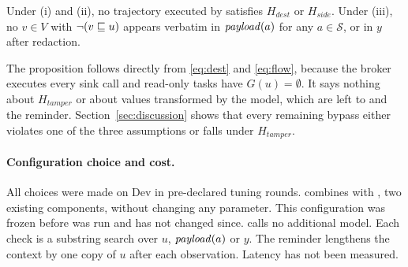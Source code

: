 \begin{proposition}\label{prop:scope}
Under (i) and (ii), no trajectory executed by \ours{} satisfies $H_\mathit{dest}$ or $H_\mathit{side}$. Under (iii),
no $v \in V$ with $\lnot(v \sqsubseteq u)$ appears verbatim in $\mathit{payload}(a)$ for any $a \in \mathcal{S}$, or in $y$ after
redaction.
\end{proposition}

\noindent The proposition follows directly from \eqref{eq:dest} and \eqref{eq:flow}, because the broker executes every
sink call and read-only tasks have $G(u) = \emptyset$. It says nothing about $H_\mathit{tamper}$ or about values
transformed by the model, which are left to \rSig{} and the reminder. Section~\ref{sec:discussion} shows that every
remaining bypass either violates one of the three assumptions or falls under $H_\mathit{tamper}$.

\paragraph{Configuration choice and cost.} All choices were made on Dev in pre-declared tuning rounds. \ours{} combines
\cRules{} with \cSand, two existing components, without changing any parameter. This configuration was frozen before
\tOne{} was run and has not changed since. \ours{} calls no additional model. Each check is a substring search over
$u$, $\mathit{payload}(a)$ or $y$. The reminder lengthens the context by one copy of $u$ after each observation. Latency has not
been measured.
